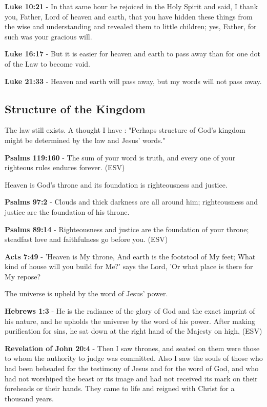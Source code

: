 \documentclass[11pt]{article}
\begin{document}
\textbf{Luke 10:21} - In that same hour he rejoiced in the Holy Spirit and said, I thank you, Father, Lord of heaven and earth, that you have hidden these things from the wise and understanding and revealed them to little children; yes, Father, for such was your gracious will.

\textbf{Luke 16:17} - But it is easier for heaven and earth to pass away than for one dot of the Law to become void.

\textbf{Luke 21:33} - Heaven and earth will pass away, but my words will not pass away.

\subsection{Structure of the Kingdom}
\label{sec:org0e5bc41}

The law still exists. A thought I have : "Perhaps structure of God's kingdom might be determined by the law and Jesus' words."

\textbf{Psalms 119:160} - The sum of your word is truth, and every one of your righteous rules endures forever. (ESV)

Heaven is God's throne and its foundation is righteousness and justice.

\textbf{Psalms 97:2} - Clouds and thick darkness are all around him; righteousness and justice are the foundation of his throne.

\textbf{Psalms 89:14} - Righteousness and justice are the foundation of your throne; steadfast love and faithfulness go before you. (ESV)

\textbf{Acts 7:49} - 'Heaven is My throne, And earth is the footstool of My feet; What kind of house will you build for Me?' says the Lord, 'Or what place is there for My repose?

The universe is upheld by the word of Jesus' power.

\textbf{Hebrews 1:3} - He is the radiance of the glory of God and the exact imprint of his nature, and he upholds the universe by the word of his power. After making purification for sins, he sat down at the right hand of the Majesty on high, (ESV)

\textbf{Revelation of John 20:4} - Then I saw thrones, and seated on them were those to whom the authority to judge was committed. Also I saw the souls of those who had been beheaded for the testimony of Jesus and for the word of God, and who had not worshiped the beast or its image and had not received its mark on their foreheads or their hands. They came to life and reigned with Christ for a thousand years.
\end{document}
